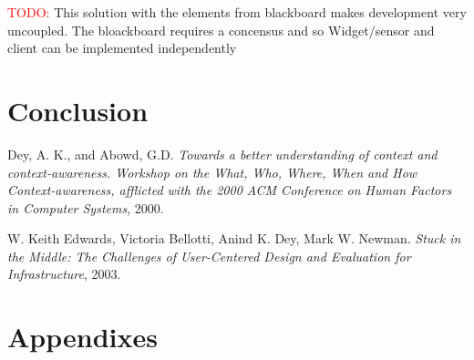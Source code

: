 \documentclass[]{report}
\newcommand\todo[1]{\textcolor{red}{TODO: }#1\PackageWarning{TODO:}{TODO tag!!}}
\begin{document}
\todo{This solution with the elements from blackboard makes development very uncoupled. The bloackboard requires a concensus and so Widget/sensor and client can be implemented independently}

\chapter{Conclusion}

\begin{thebibliography}{9}

  Dey, A. K., and Abowd, G.D.
  \emph{Towards a better understanding of context and context-awareness. Workshop on the What, Who, Where, When and How Context-awareness, afflicted with the 2000 ACM Conference on Human Factors in Computer Systems},
  2000.
  
  W. Keith Edwards, Victoria Bellotti, Anind K. Dey,
  Mark W. Newman.
  \emph{Stuck in the Middle: The Challenges of
  User-Centered Design and Evaluation for Infrastructure},
  2003.

\end{thebibliography}
\chapter{Appendixes}
\end{document}
